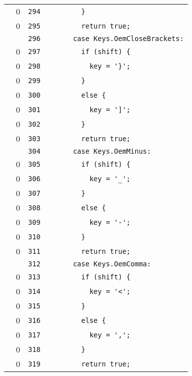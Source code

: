 \documentclass[a4paper,10pt]{article}
\begin{document}
\begin{longtable}[l]{lrrl}
\cellcolor{red} & 0 & \verb~294~ & \verb~        }~\\
\cellcolor{red} & 0 & \verb~295~ & \verb~        return true;~\\
\cellcolor{gray} &  & \verb~296~ & \verb~      case Keys.OemCloseBrackets:~\\
\cellcolor{red} & 0 & \verb~297~ & \verb~        if (shift) {~\\
\cellcolor{red} & 0 & \verb~298~ & \verb~          key = '}';~\\
\cellcolor{red} & 0 & \verb~299~ & \verb~        }~\\
\cellcolor{red} & 0 & \verb~300~ & \verb~        else {~\\
\cellcolor{red} & 0 & \verb~301~ & \verb~          key = ']';~\\
\cellcolor{red} & 0 & \verb~302~ & \verb~        }~\\
\cellcolor{red} & 0 & \verb~303~ & \verb~        return true;~\\
\cellcolor{gray} &  & \verb~304~ & \verb~      case Keys.OemMinus:~\\
\cellcolor{red} & 0 & \verb~305~ & \verb~        if (shift) {~\\
\cellcolor{red} & 0 & \verb~306~ & \verb~          key = '_';~\\
\cellcolor{red} & 0 & \verb~307~ & \verb~        }~\\
\cellcolor{red} & 0 & \verb~308~ & \verb~        else {~\\
\cellcolor{red} & 0 & \verb~309~ & \verb~          key = '-';~\\
\cellcolor{red} & 0 & \verb~310~ & \verb~        }~\\
\cellcolor{red} & 0 & \verb~311~ & \verb~        return true;~\\
\cellcolor{gray} &  & \verb~312~ & \verb~      case Keys.OemComma:~\\
\cellcolor{red} & 0 & \verb~313~ & \verb~        if (shift) {~\\
\cellcolor{red} & 0 & \verb~314~ & \verb~          key = '<';~\\
\cellcolor{red} & 0 & \verb~315~ & \verb~        }~\\
\cellcolor{red} & 0 & \verb~316~ & \verb~        else {~\\
\cellcolor{red} & 0 & \verb~317~ & \verb~          key = ',';~\\
\cellcolor{red} & 0 & \verb~318~ & \verb~        }~\\
\cellcolor{red} & 0 & \verb~319~ & \verb~        return true;~\\

\end{longtable}
\end{document}
